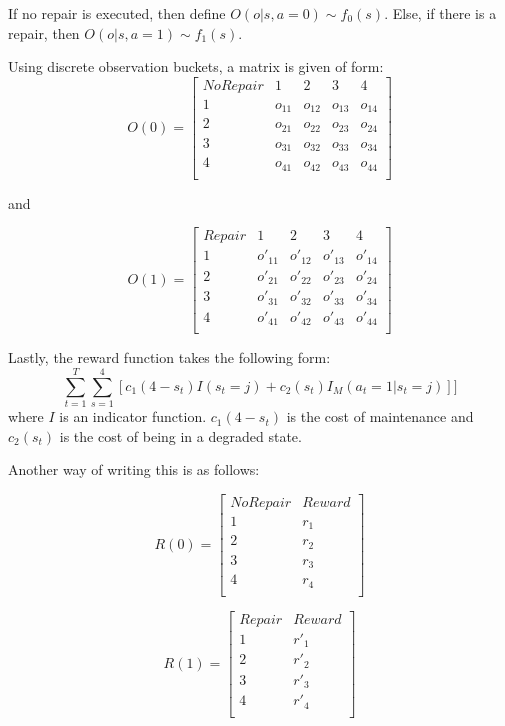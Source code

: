 \documentclass[english]{article}
\numberwithin{equation}{section}
\begin{document}
	If no repair is executed, then define $O(o|s,a=0) \sim f_0(s)$. Else, if there is a repair, then $O(o|s,a=1) \sim f_1(s)$.
	
	Using discrete observation buckets, a matrix is given of form:
	$$    O(0) = 
	\begin{bmatrix}
	No Repair & 1 & 2 & 3 & 4 \\
	1 & o_{11} & o_{12} & o_{13} & o_{14} \\
	2 & o_{21} & o_{22} & o_{23} & o_{24} \\
	3 & o_{31} & o_{32} & o_{33} & o_{34} \\
	4 & o_{41} & o_{42} & o_{43} & o_{44} \\
	\end{bmatrix}
	$$
	
	and
	
	$$    O(1) = 
	\begin{bmatrix}
	Repair & 1 & 2 & 3 & 4 \\
	1 & o'_{11} & o'_{12} & o'_{13} & o'_{14} \\
	2 & o'_{21} & o'_{22} & o'_{23} & o'_{24} \\
	3 & o'_{31} & o'_{32} & o'_{33} & o'_{34} \\
	4 & o'_{41} & o'_{42} & o'_{43} & o'_{44} \\
	\end{bmatrix}
	$$
	
	Lastly, the reward function takes the following form:
	$$\sum_{t=1}^T \sum_{s=1}^4 [c_1(4-s_t)I(s_t=j) + c_2(s_t)I_M(a_t=1|s_t=j)]]$$
	where $I$ is an indicator function. $c_1(4-s_t)$ is the cost of maintenance and $c_2(s_t)$ is the cost of being in a degraded state.
	
	Another way of writing this is as follows:
	
	$$
	R(0) = 
	\begin{bmatrix}
	No Repair & Reward \\
	1 & r_1 \\
	2 & r_2 \\
	3 & r_3 \\
	4 & r_4 \\
	\end{bmatrix}
	$$
	
	$$
	R(1) = 
	\begin{bmatrix}
	Repair & Reward \\
	1 & r'_1 \\
	2 & r'_2 \\
	3 & r'_3 \\
	4 & r'_4 \\
	\end{bmatrix}
	$$
	 
\end{document}
